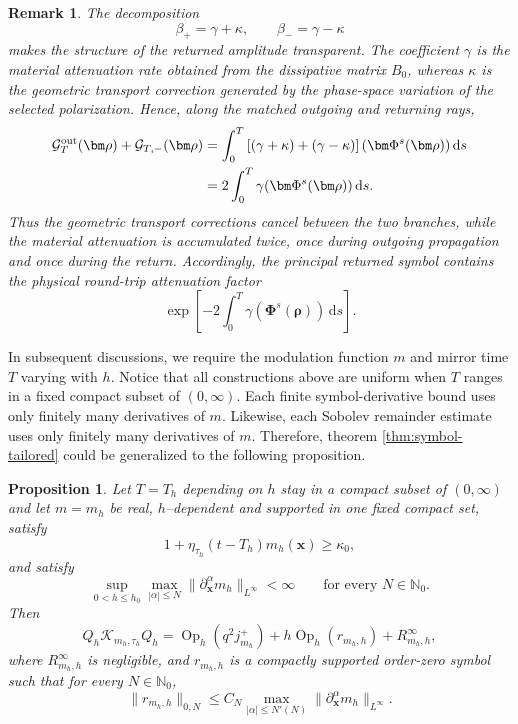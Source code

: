 \documentclass[11pt,reqno]{amsart}
\newtheorem{remark}{Remark}[section]
\newtheorem{proposition}{Proposition}[section]
\newcommand{\dd}{\,\mathrm{d}}
\newcommand{\Op}{\operatorname{Op}}
\numberwithin{equation}{section}
\begin{document}
\begin{remark}
The decomposition
$$
    \beta_+=\gamma+\kappa, \qquad \beta_-=\gamma-\kappa
$$
makes the structure of the returned amplitude transparent. The coefficient $\gamma$ is the material attenuation rate obtained from the dissipative matrix $B_0$, whereas $\kappa$ is the geometric transport correction generated by the phase-space variation of the selected polarization. Hence, along the matched outgoing and returning rays,
$$
\begin{aligned}
    \mathcal G_T^{\rm out}(\bm\rho)+\mathcal G_{T,-}(\bm\rho)&=\int_0^T\left[(\gamma+\kappa)+(\gamma-\kappa)\right](\bm\Phi^s(\bm\rho))\dd s\\
    &=2\int_0^T\gamma(\bm\Phi^s(\bm\rho))\dd s.
\end{aligned}
$$
Thus the geometric transport corrections cancel between the two branches, while the material attenuation is accumulated twice, once during outgoing propagation and once during the return. Accordingly, the principal returned symbol contains the physical round-trip attenuation factor
$$
    \exp\left[-2\int_0^T\gamma(\bm\Phi^s(\bm\rho))\dd s\right].
$$
\end{remark}

In subsequent discussions, we require the modulation function $m$ and mirror time $T$ varying with $h$. Notice that all constructions above are uniform when $T$ ranges in a fixed compact subset of $(0,\infty)$. Each finite symbol-derivative bound uses only finitely many derivatives of $m$. Likewise, each Sobolev remainder estimate uses only finitely many derivatives of $m$. Therefore, theorem \ref{thm:symbol-tailored} could be generalized to the following proposition.

\begin{proposition}
Let $T=T_h$ depending on $h$ stay in a compact subset of $(0,\infty)$ and let $m=m_h$ be real, $h$--dependent and supported in one fixed compact set, satisfy
\begin{equation*}
1+\eta_{\tau_h}(t-T_h)m_h(\bm x)\ge\kappa_0,
\end{equation*}
and satisfy
\begin{equation*}
 \sup_{0<h\le h_0}\max_{|\alpha|\le N}\|\partial_{\bm x}^{\alpha}m_h\|_{L^\infty}<\infty \qquad \text{for every }N\in\mathbb N_0.
\end{equation*}
Then
\begin{equation}\label{eq:uniform-m-symbol-remainder}
 Q_h\mathcal K_{m_h,\tau_h}Q_h = \Op_h(q^2j_{m_h}^+)+h\Op_h(r_{m_h,h})+R_{m_h,h}^{\infty},
\end{equation}
where $R_{m_h,h}^\infty$ is negligible, and $r_{m_h,h}$ is a compactly supported order-zero symbol such that for every $N\in\mathbb{N}_0$,
\begin{equation*}
 \|r_{m_h,h}\|_{0,N} \le C_N\max_{|\alpha|\le N'(N)}\|\partial_{\bm x}^\alpha m_h\|_{L^\infty}.
\end{equation*}
\end{proposition}
\end{document}
